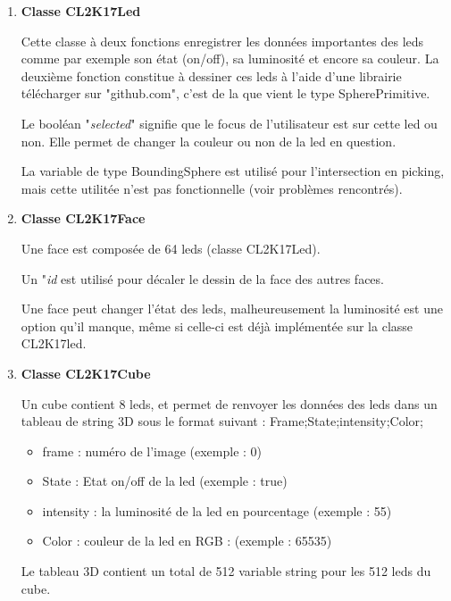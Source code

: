 \documentclass[a4paper,12pt]{article}
\begin{document}
\begin{enumerate}
    \item \textbf{Classe CL2K17Led}
    
    Cette classe à deux fonctions enregistrer les données importantes des leds comme par exemple son état (on/off), sa luminosité et encore sa couleur. La deuxième fonction constitue à dessiner ces leds à l'aide d'une librairie télécharger sur "github.com", c'est de la que vient le type SpherePrimitive. 
    
    Le booléan "\emph{selected}" signifie que le focus de l'utilisateur est sur cette led ou non. Elle permet de changer la couleur ou non de la led en question.
    
    La variable de type BoundingSphere est utilisé pour l'intersection en picking, mais cette utilitée n'est pas fonctionnelle (voir problèmes rencontrés). 
    
    \item \textbf{Classe CL2K17Face}
    
    Une face est composée de 64 leds (classe CL2K17Led).
    
    Un "\emph{id} est utilisé pour décaler le dessin de la face des autres faces.
    
    Une face peut changer l'état des leds, malheureusement la luminosité est une option qu'il manque, même si celle-ci est déjà implémentée sur la classe CL2K17led.
    
    \item \textbf{Classe CL2K17Cube}
    
    Un cube contient 8 leds, et permet de renvoyer les données des leds dans un tableau de string 3D sous le format suivant : Frame;State;intensity;Color;
    
    \begin{itemize}
        \item frame : numéro de l'image (exemple : 0)
        \item State : Etat on/off de la led (exemple : true)
        \item intensity : la luminosité de la led en pourcentage (exemple : 55)
        \item Color : couleur de la led en RGB : (exemple : 65535)
    \end{itemize}
    
    Le tableau 3D contient un total de 512 variable string pour les 512 leds du cube.
    
\end{enumerate}
\end{document}
